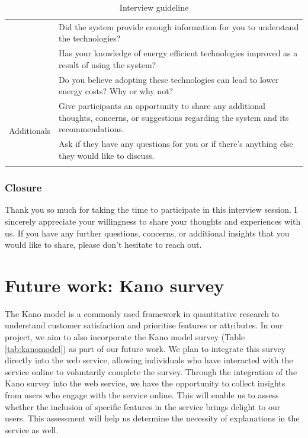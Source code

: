 \begin{center}
\begin{longtable}{ | p{} | p{} | }
    & Did the system provide enough information for you to understand the technologies? \\
    & Has your knowledge of energy efficient technologies improved as a result of using the system? \\
    & Do you believe adopting these technologies can lead to lower energy costs? Why or why not? \\
    \hline
    \multirow{2}{4em}{Additionals} & Give participants an opportunity to share any additional thoughts, concerns, or suggestions regarding the system and its recommendations. \\
    & Ask if they have any questions for you or if there's anything else they would like to discuss. \\
    \hline
  \caption{Interview guideline}
  \label{tab:interview}
  \end{longtable}
\end{center}


\subsubsection{Closure}

Thank you so much for taking the time to participate in this interview session. 
I sincerely appreciate your willingness to share your thoughts and experiences with us. 
If you have any further questions, concerns, or additional insights that you would like to share, please don't hesitate to reach out. 


\section{Future work: Kano survey}

The Kano model \cite{Sauerwein1996} is a commonly used framework in quantitative research to understand customer satisfaction and prioritise features or attributes. 
In our project, we aim to also incorporate the Kano model survey (Table \ref{tab:kanomodel}) as part of our future work. 
We plan to integrate this survey directly into the web service, allowing individuals who have interacted with the service online to voluntarily complete the survey.
Through the integration of the Kano survey into the web service, we have the opportunity to collect insights from users who engage with the service online. 
This will enable us to assess whether the inclusion of specific features in the service brings delight to our users.
This assessment will help us determine the necessity of explanations in the service as well. 

